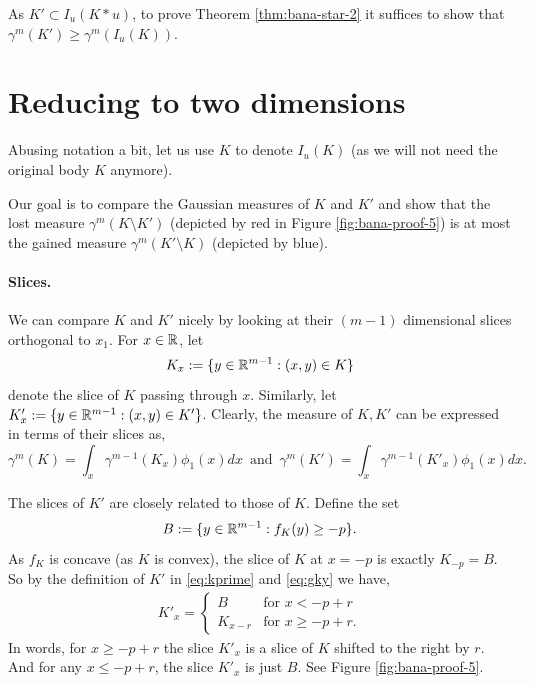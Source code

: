 As $K' \subset I_u(K*u)$, to prove Theorem \ref{thm:bana-star-2} it suffices to show that $\gamma^m(K') \geq \gamma^m(I_u(K))$.

\section{Reducing to two dimensions}
\label{sec:bana-proof-reducing-two-dimensions}
Abusing notation a bit, let us use $K$ to denote $I_u(K)$ (as  we will not need the original body $K$ anymore).

Our goal is to compare the Gaussian measures of  $K$ and $K'$ and show that the lost measure $\gamma^m(K\setminus K')$ (depicted by red in Figure \ref{fig:bana-proof-5}) is at most the gained measure $\gamma^m(K'\setminus K)$ (depicted by blue).

\paragraph{Slices.} We can compare $K$
 and $K'$ nicely by looking at their $(m-1)$ dimensional slices orthogonal to $x_1$.
 For $x \in \mathbb{R}$, let 
 \[K_x:= \{y \in \mathbb{R}^{m-1}: (x,y) \in K\}\] 
denote the slice of $K$ passing through $x$. 
Similarly, let $K'_x:= \{y \in \mathbb{R}^{m-1}: (x,y) \in K'\}$. 
Clearly,
the measure of $K,K'$ can be expressed in terms of their slices as,
\[\gamma^m(K) = \int_x\gamma^{m-1}(K_x) \phi_1(x) dx \, \text{ and } \, \gamma^m(K') = \int_x \gamma^{m-1}(K'_x) \phi_1(x) dx.\]

The slices of $K'$ are closely related to those of $K$.
Define the set \begin{equation}
    B :=\{y \in \mathbb{R}^{m-1}: f_K(y) \geq -p\}.
    \label{eq:banaB}
\end{equation}
As $f_K$ is concave (as $K$ is convex), the slice of $K$ at $x=-p$ is exactly $K_{-p}=B$. So by the definition of $K'$ in \eqref{eq:kprime} and \eqref{eq:gky} we have,
\begin{align}
    K'_x = \begin{cases} 
       B  &  \text{for $x < -p+r$} \\
       K_{x-r}  & \text{for $x \geq  -p+r$}.
       \end{cases}
       \label{eq:k'slices}
\end{align} 
In words, for $x \geq -p+r$ the slice $K'_x$ is a slice of $K$ shifted to the right by $r$. 
And for any $x \leq -p+r$,  the slice $K'_x$ is just $B$. See Figure \ref{fig:bana-proof-5}.


